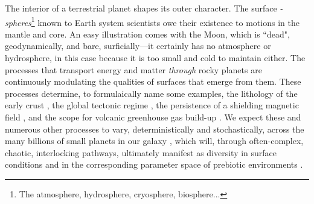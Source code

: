 The interior of a terrestrial planet shapes its outer character. The surface \textit{-spheres}\footnote{The atmosphere, hydrosphere, cryosphere, biosphere...} known to Earth system scientists owe their existence to motions in the mantle and core. An easy illustration comes with the Moon, which is ``dead", geodynamically, and bare, surficially---it certainly has no atmosphere or hydrosphere, in this case because it is too small and cold to maintain either. The processes that transport energy and matter \textit{through} rocky planets are continuously modulating the qualities of surfaces that emerge from them. These processes determine, to formulaically name some examples, %
the lithology of the early crust \citep[the productivity and composition of mantle melting; e.g.,][]{mckenzie_volume_1988, fraeman_influence_2010, HERZBERG2010, wade_divergent_2017, tosi_mercury_2019, dyck_effect_2021, reynard_primordial_2022}, the global tectonic regime \citep[the mysteries of subduction initiation; e.g.,][]{valencia_inevitability_2007, valencia_convection_2009, korenaga_likelihood_2010, foley_conditions_2012, orourke_terrestrial_2012, noack2014can, noack_plate_2014}, the persistence of a shielding magnetic field \citep[outer core convection inducing a geodynamo; e.g.,][]{sharpe_thermal_1978, nimmo_why_2002, gaidos_thermodynamic_2010, boujibar_superearth_2020, zhang_thermal_2022}, and the scope for volcanic greenhouse gas build-up \citep[feasibility of and redox conditions during magmatism; e.g.,][]{kite2009geodynamics, noack_coupling_2012, vilella_fully_2017, ortenzi_mantle_2020, krissansen-totton_was_2021, honing_early_2021, baumeister_redox_2023}. We expect these and numerous other processes to vary, deterministically and stochastically, across the many billions of small planets in our galaxy \citep{cassan_one_2012}, which will, through often-complex, chaotic, interlocking pathways, ultimately manifest as diversity in surface conditions and in the corresponding parameter space of prebiotic environments \citep{walton_can_2022}.


